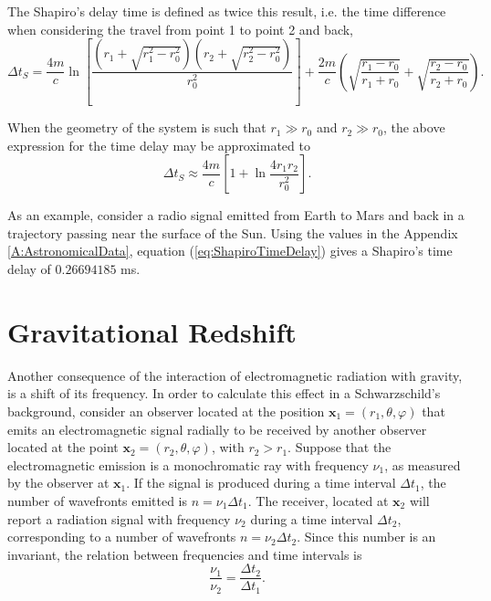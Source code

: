 The Shapiro's delay time is defined as twice this result, i.e. the time difference when considering the travel from point 1 to point 2 and back,
\begin{equation}
\Delta t_S = \frac{4m}{c} \ln \left[ \frac{\left( r_1 + \sqrt{r_1^2 - r_0^2} \right)\left( r_2 + \sqrt{r_2^2 - r_0^2} \right)}{r_0^2} \right] + \frac{2m}{c} \left( \sqrt{\frac{r_1 - r_0}{r_1 + r_0}} + \sqrt{\frac{r_2 - r_0}{r_2 + r_0}}\right).
\end{equation}

When the geometry of the system is such that $r_1 \gg r_0$ and $r_2 \gg r_0$, the above expression for the time delay may be approximated to
\begin{equation}
\Delta t_S \approx \frac{4m}{c} \left[ 1+ \ln \frac{4r_1 r_2}{r_0^2} \right]. \label{eq:ShapiroTimeDelay}
\end{equation}

As an example, consider a radio signal emitted from Earth to Mars and back in a trajectory passing near the surface of the Sun. Using the values in the Appendix \ref{A:AstronomicalData}, equation (\ref{eq:ShapiroTimeDelay}) gives a Shapiro's time delay of $0.26694185$ ms.

\section{Gravitational Redshift}

Another consequence of the interaction of electromagnetic radiation with gravity, is a shift of its frequency. In order to calculate this effect in a Schwarzschild's background, consider an observer located at the position $\textbf{x}_1 = (r_1, \theta, \varphi)$ that emits an electromagnetic signal radially to be received by another observer located at the point $\textbf{x}_2 = (r_2, \theta, \varphi)$, with $r_2 > r_1$. Suppose that the electromagnetic emission is a monochromatic ray with frequency $\nu_1$, as measured by the observer at $\textbf{x}_1$. If the signal is produced during a time interval  $\Delta t_1$, the number of wavefronts emitted is $n= \nu_1 \Delta t_1$. The receiver, located at $\textbf{x}_2$ will report a radiation signal with frequency $\nu_2$ during a time interval $\Delta t_2$, corresponding to a number of wavefronts  $n= \nu_2 \Delta t_2$. Since this number is an invariant, the relation between frequencies and time intervals is
\begin{equation}
\frac{\nu_1}{\nu_2} = \frac{\Delta t_2}{\Delta t_1}.
\end{equation}

